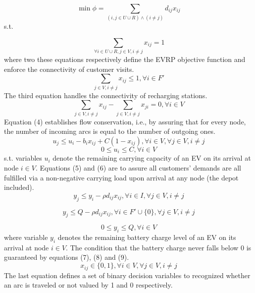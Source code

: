 \documentclass[conference,compsoc]{IEEEtran}
\begin{document}
\begin{equation}
    \min \phi = \sum_{\left(i, j \in U \cup R\right) \land \left(i \neq j \right)}{d_{ij}x_{ij}}
\end{equation}
s.t.

\begin{equation}
    \sum_{\forall i \in U \cup R, j \in V, i \neq j}{x_{ij}} = 1
\end{equation}
where two these equations respectively define the EVRP objective function and enforce the connectivity of customer visits.\\
\begin{equation}
    \sum_{j \in V, i \neq j}{x_{ij}} \leq 1, \forall i \in F'
\end{equation}
The third equation handles the connectivity of recharging stations.\\
\begin{equation}
    \sum_{j \in V, i \neq j}{x_{ij}} - \sum_{j \in V, i \neq j}{x_{ji} = 0, \forall i \in V}
\end{equation}
Equation (4) establishes flow conservation, i.e., by assuring that for every node, the number of incoming arcs is equal to the number of outgoing ones.\\
\begin{equation}
    u_j \leq u_i - b_ix_{ij} + C\left(1-x_{ij}\right), \forall i\in V, \forall j \in V, i \neq j
\end{equation}
\begin{equation}
    0 \leq u_i \leq C, \forall i \in V
\end{equation}
s.t. variables $u_i$ denote the remaining carrying capacity of an EV on its arrival at node $i \in V$. Equations (5) and (6) are to assure all customers' demands are all fulfilled via a non-negative carrying load upon arrival at any node (the depot included).\\
\begin{equation}
    y_j \leq y_i -\rho d_{ij}x_{ij}, \forall i \in I, \forall j \in V, i \neq j
\end{equation}

\begin{equation}
    y_j \leq Q-\rho d_{ij}x_{ij}, \forall i \in F' \cup \{0\}, \forall j \in V, i \neq j
\end{equation}

\begin{equation}
    0 \leq y_i \leq Q, \forall i \in V
\end{equation}
where variable $y_i$ denotes the remaining battery charge level of an EV on its arrival at node $i \in V$. The condition that the battery charge never falls below 0 is guaranteed by equations (7), (8) and (9).\\
\begin{equation}
    x_{ij} \in \{0,1\}, \forall i \in V, \forall j \in V, i \neq j
\end{equation}
The last equation defines a set of binary decision variables to recognized whether an arc is traveled or not valued by 1 and 0 respectively. 
\end{document}
